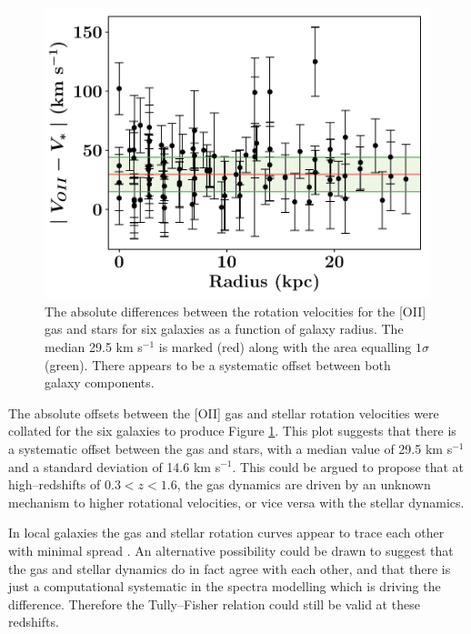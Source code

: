 \documentclass[12pt, twocolumn, nofootinbib]{revtex4-1}    %
\begin{document}
\begin{figure}
\includegraphics[width=1.0\linewidth]{data/deltav_vs_radius.pdf}
\caption{The absolute differences between the rotation velocities for the [OII] gas and stars for six galaxies as a function of galaxy radius. The median 29.5 km s$^{-1}$ is marked (red) along with the area equalling $1\sigma$ (green). There appears to be a systematic offset between both galaxy components.}
\label{fig:rotation_velocity_differences}
\end{figure} 

The absolute offsets between the [OII] gas and stellar rotation velocities were collated for the six galaxies to produce Figure \ref{fig:rotation_velocity_differences}. This plot suggests that there is a systematic offset between the gas and stars, with a median value of 29.5 km s$^{-1}$ and a standard deviation of 14.6 km s$^{-1}$. This could be argued to propose that at high--redshifts of $0.3<z<1.6$, the gas dynamics are driven by an unknown mechanism to higher rotational velocities, or vice versa with the stellar dynamics. 

In local galaxies the gas and stellar rotation curves appear to trace each other with minimal spread \citep{2004A&A...424..447P}. An alternative possibility could be drawn to suggest that the gas and stellar dynamics do in fact agree with each other, and that there is just a computational systematic in the spectra modelling which is driving the difference. Therefore the Tully--Fisher relation could still be valid at these redshifts.

\vspace{2ex} %
\end{document}
